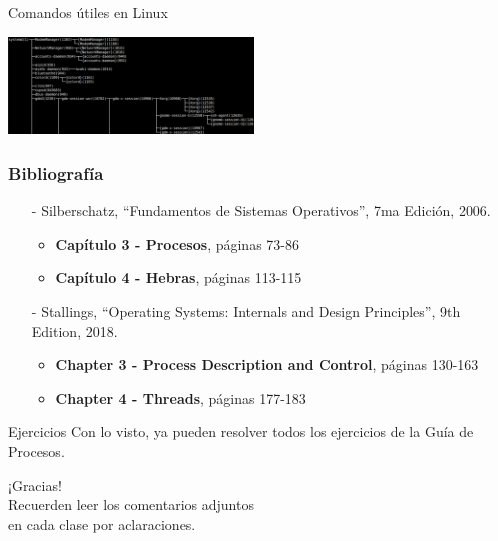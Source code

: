 \documentclass[aspectratio=169]{beamer}
\begin{document}
\begin{frame}[t,fragile]{Comandos útiles en Linux}
\begin{textblock}{90}
    \includegraphics[width=6.5cm]{img/pstree.png}
    \end{textblock}
\end{frame}

\begin{frame}[fragile]
    \frametitle{Bibliografía}
    \begin{itemize}
        \setlength\itemsep{0.5cm}
        \item[-] \small Silberschatz, ``Fundamentos de Sistemas Operativos'', 7ma Edición, 2006.\\
        \begin{itemize}
            \item \textbf{Capítulo 3 - Procesos}, páginas 73-86
            \item \textbf{Capítulo 4 - Hebras}, páginas 113-115
        \end{itemize}
        \item[-] \small Stallings, ``Operating Systems: Internals and Design Principles'', 9th Edition, 2018.\\
        \begin{itemize}
            \item \textbf{Chapter 3 - Process Description and Control}, páginas 130-163
            \item \textbf{Chapter 4 - Threads}, páginas 177-183
        \end{itemize}
    \end{itemize}
\end{frame}

\begin{frame}[fragile]{Ejercicios}
    Con lo visto, ya pueden resolver todos los ejercicios de la Guía de Procesos.
\end{frame}

\begin{frame}[plain]
    \begin{center}
    \vspace{2cm}
    \huge ¡Gracias!\\
    \vspace{2cm}
    \normalsize Recuerden leer los comentarios adjuntos\\ en cada clase por aclaraciones.
    \end{center}
\end{frame}
\end{document}
